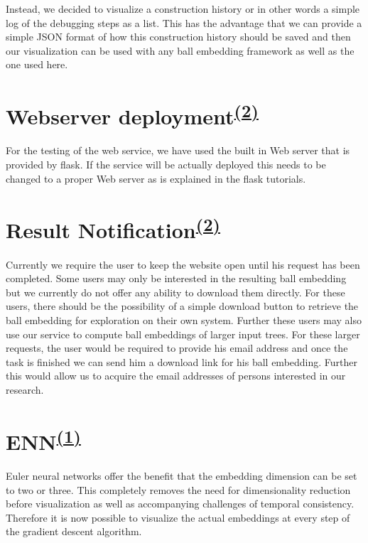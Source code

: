 Instead, we decided to visualize a construction history or in other words a simple log of the debugging steps as a list. This has the advantage that we can provide a simple JSON format of how this construction history should be saved and then our visualization can be used with any ball embedding framework as well as the one used here.


\section[Webserver deployment]{Webserver deployment\textsuperscript{\hyperref[Oliver]{(2)}}} \label{web_extension}
For the testing of the web service, we have used the built in Web server that is provided by flask. If the service will be actually deployed this needs to be changed to a proper Web server as is explained in the flask tutorials.

\section[Result Notification]{Result Notification\textsuperscript{\hyperref[Oliver]{(2)}}}
Currently we require the user to keep the website open until his request has been completed. Some users may only be interested in the resulting ball embedding but we currently do not offer any ability to download them directly. For these users, there should be the possibility of a simple download button to retrieve the ball embedding for exploration on their own system. Further these users may also use our service to compute ball embeddings of larger input trees. For these larger requests, the user would be required to provide his email address and once the task is finished we can send him a download link for his ball embedding. Further this would allow us to acquire the email addresses of persons interested in our research.

\section[ENN]{ENN\textsuperscript{\hyperref[Jan]{(1)}}}
Euler neural networks \cite{dong2020learning} offer the benefit that the embedding dimension can be set to two or three. This completely removes the need for dimensionality reduction before visualization as well as accompanying challenges of temporal consistency. Therefore it is now possible to visualize the actual embeddings at every step of the gradient descent algorithm.

